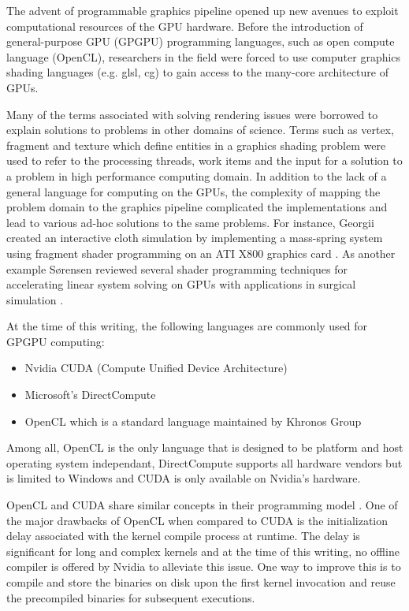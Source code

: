The advent of programmable graphics pipeline opened up new avenues to exploit computational resources of the
GPU hardware. Before the introduction of general-purpose GPU (GPGPU) programming languages, such as open compute language (OpenCL), 
researchers in the field were forced to use computer graphics shading languages (e.g. glsl, cg) to gain access to 
the many-core architecture of GPUs. 

Many of the terms associated with solving rendering issues were borrowed to explain solutions to problems in 
other domains of science. Terms such as vertex, fragment and texture which define entities in a graphics 
shading problem were used to refer to the processing threads, work items and the input for a solution to a 
problem in high performance computing domain. In addition to the lack of a general language for computing on the GPUs, 
the complexity of mapping the problem domain to the graphics pipeline complicated the implementations and lead 
to various ad-hoc solutions to the same problems. For instance, Georgii \etal created an interactive cloth simulation 
by implementing a mass-spring system using fragment shader programming on an ATI X800 graphics card \cite{Georgii2005}. 
As another example S{\o}rensen \etal reviewed several shader programming techniques for accelerating 
linear system solving on GPUs with applications in surgical simulation \cite{Sørensen2006a}. 

At the time of this writing, the following languages are commonly used for GPGPU computing:
\begin{itemize}
 \item Nvidia CUDA (Compute Unified Device Architecture)
 \item Microsoft's DirectCompute
 \item OpenCL which is a standard language maintained by Khronos Group
\end{itemize}

Among all, OpenCL is the only language that is designed to be platform and 
host operating system independant, DirectCompute supports all hardware vendors
but is limited to Windows and CUDA is only available on Nvidia's hardware. 

OpenCL and CUDA share similar concepts in their programming model \cite{gaster2012heterogeneous}.
One of the major drawbacks of OpenCL when compared to CUDA is the initialization delay 
associated with the kernel compile process at runtime. The delay is significant for long
and complex kernels and at the time of this writing, no offline compiler is offered by Nvidia
to alleviate this issue. One way to improve this is to compile and store the binaries 
on disk upon the first kernel invocation and reuse the precompiled binaries for subsequent 
executions. 

